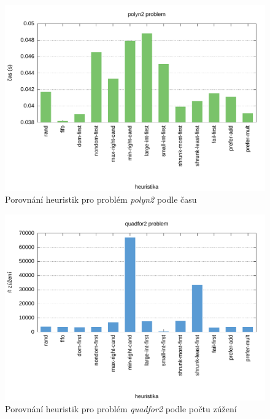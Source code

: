 {\begin{figure}[H]
\centering
\includegraphics[scale=0.68]{chart/polyn2_time.pdf}
\caption{Porovnání heuristik pro problém \emph{polyn2} podle času}
\end{figure}

\begin{figure}[H]
\centering
\includegraphics[scale=0.68]{chart/quadfor2_nar.pdf}
\caption{Porovnání heuristik pro problém \emph{quadfor2} podle počtu zúžení}
\end{figure}

}

